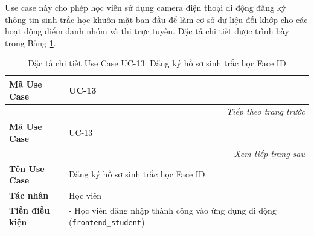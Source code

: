 \documentclass[../DoAn.tex]{subfiles}
\begin{document}
Use case này cho phép học viên sử dụng camera điện thoại di động đăng ký thông tin sinh trắc học khuôn mặt ban đầu để làm cơ sở dữ liệu đối khớp cho các hoạt động điểm danh nhóm và thi trực tuyến. Đặc tả chi tiết được trình bày trong Bảng \ref{table:spec_uc_13}.

\begin{longtable}{|p{2.8cm}|p{0.8cm}|p{2.2cm}|p{7.5cm}|}
    \caption{Đặc tả chi tiết Use Case UC-13: Đăng ký hồ sơ sinh trắc học Face ID}
    \label{table:spec_uc_13} \\
    \hline
    \textbf{Mã Use Case} & \multicolumn{3}{l|}{UC-13} \\ \hline
    \endfirsthead
    \multicolumn{4}{r}{\textit{Tiếp theo trang trước}} \\
    \hline
    \textbf{Mã Use Case} & \multicolumn{3}{l|}{UC-13} \\ \hline
    \endhead
    \hline
    \multicolumn{4}{r}{\textit{Xem tiếp trang sau}} \\
    \endfoot
    \hline
    \endlastfoot
    \textbf{Tên Use Case} & \multicolumn{3}{l|}{Đăng ký hồ sơ sinh trắc học Face ID} \\ \hline
    \textbf{Tác nhân} & \multicolumn{3}{l|}{Học viên} \\ \hline
    \textbf{Tiền điều kiện} & \multicolumn{3}{p{10.9cm}|}{- Học viên đăng nhập thành công vào ứng dụng di động (\mbox{\texttt{frontend\_student}}). 

}
\end{longtable}
\end{document}
